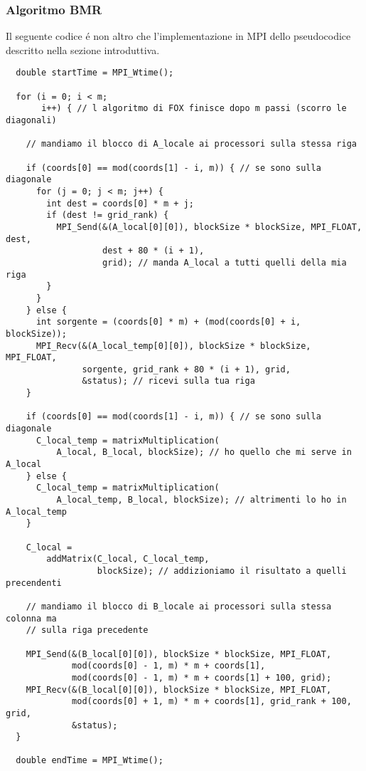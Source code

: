 \subsubsection{Algoritmo BMR}
Il seguente codice é non altro che l'implementazione in MPI dello pseudocodice descritto nella sezione introduttiva.
\begin{lstlisting}
  double startTime = MPI_Wtime();

  for (i = 0; i < m;
       i++) { // l algoritmo di FOX finisce dopo m passi (scorro le diagonali)

    // mandiamo il blocco di A_locale ai processori sulla stessa riga

    if (coords[0] == mod(coords[1] - i, m)) { // se sono sulla diagonale
      for (j = 0; j < m; j++) {
        int dest = coords[0] * m + j;
        if (dest != grid_rank) {
          MPI_Send(&(A_local[0][0]), blockSize * blockSize, MPI_FLOAT, dest,
                   dest + 80 * (i + 1),
                   grid); // manda A_local a tutti quelli della mia riga
        }
      }
    } else {
      int sorgente = (coords[0] * m) + (mod(coords[0] + i, blockSize));
      MPI_Recv(&(A_local_temp[0][0]), blockSize * blockSize, MPI_FLOAT,
               sorgente, grid_rank + 80 * (i + 1), grid,
               &status); // ricevi sulla tua riga
    }

    if (coords[0] == mod(coords[1] - i, m)) { // se sono sulla diagonale
      C_local_temp = matrixMultiplication(
          A_local, B_local, blockSize); // ho quello che mi serve in A_local
    } else {
      C_local_temp = matrixMultiplication(
          A_local_temp, B_local, blockSize); // altrimenti lo ho in A_local_temp
    }

    C_local =
        addMatrix(C_local, C_local_temp,
                  blockSize); // addizioniamo il risultato a quelli precendenti

    // mandiamo il blocco di B_locale ai processori sulla stessa colonna ma
    // sulla riga precedente

    MPI_Send(&(B_local[0][0]), blockSize * blockSize, MPI_FLOAT,
             mod(coords[0] - 1, m) * m + coords[1],
             mod(coords[0] - 1, m) * m + coords[1] + 100, grid);
    MPI_Recv(&(B_local[0][0]), blockSize * blockSize, MPI_FLOAT,
             mod(coords[0] + 1, m) * m + coords[1], grid_rank + 100, grid,
             &status);
  }

  double endTime = MPI_Wtime();
\end{lstlisting}

